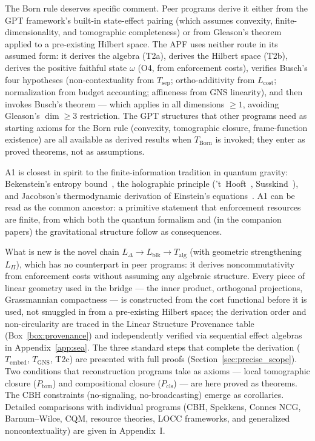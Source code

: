 \documentclass[11pt]{article}
\theoremstyle{remark}
\begin{document}
\smallskip\noindent The Born rule deserves specific comment.  Peer programs derive it either from the GPT framework's built-in state-effect pairing (which assumes convexity, finite-dimensionality, and tomographic completeness) or from Gleason's theorem applied to a pre-existing Hilbert space.  The APF uses neither route in its assumed form: it derives the algebra (T2a), derives the Hilbert space (T2b), derives the positive faithful state $\omega$ (O4, from enforcement costs), verifies Busch's four hypotheses (non-contextuality from $T_{\mathrm{sep}}$; ortho-additivity from $L_{\mathrm{cost}}$; normalization from budget accounting; affineness from GNS linearity), and then invokes Busch's theorem --- which applies in all dimensions $\ge 1$, avoiding Gleason's $\dim \ge 3$ restriction.  The GPT structures that other programs need as starting axioms for the Born rule (convexity, tomographic closure, frame-function existence) are all available as derived results when $T_{\mathrm{Born}}$ is invoked; they enter as proved theorems, not as assumptions.

A1 is closest in spirit to the finite-information tradition in quantum gravity: Bekenstein's entropy bound~\cite{Bekenstein1981}, the holographic principle ('t~Hooft~\cite{tHooft1993}, Susskind~\cite{Susskind1995}), and Jacobson's thermodynamic derivation of Einstein's equations~\cite{Jacobson1995}.  A1 can be read as the common ancestor: a primitive statement that enforcement resources are finite, from which both the quantum formalism and (in the companion papers) the gravitational structure follow as consequences.

What is new is the novel chain $L_\Delta \to L_{\mathrm{blk}} \to T_{\mathrm{alg}}$ (with geometric strengthening $L_\Pi$), which has no counterpart in peer programs: it derives noncommutativity from enforcement costs without assuming any algebraic structure.  Every piece of linear geometry used in the bridge --- the inner product, orthogonal projections, Grassmannian compactness --- is constructed from the cost functional before it is used, not smuggled in from a pre-existing Hilbert space; the derivation order and non-circularity are traced in the Linear Structure Provenance table (Box~\ref{box:provenance}) and independently verified via sequential effect algebras in Appendix~\ref{app:sea}.  The three standard steps that complete the derivation ($T_{\mathrm{embed}}$, $T_{\mathrm{GNS}}$, T2c) are presented with full proofs (Section~\ref{sec:precise_scope}).  Two conditions that reconstruction programs take as axioms --- local tomographic closure ($P_{\mathrm{tom}}$) and compositional closure ($P_{\mathrm{cls}}$) --- are here proved as theorems.  The CBH constraints (no-signaling, no-broadcasting) emerge as corollaries.  Detailed comparisons with individual programs (CBH, Spekkens, Connes NCG, Barnum--Wilce, CQM, resource theories, LOCC frameworks, and generalized noncontextuality) are given in Appendix~I.
\end{document}
